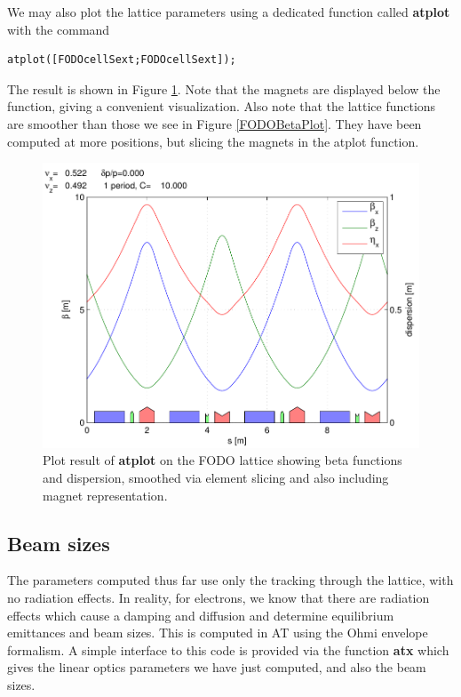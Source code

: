 \documentclass[acus]{article}
\newcommand{\mfun}[1]{{\bf{#1}}}
\begin{document}
We may also plot the lattice parameters using a dedicated function called \mfun{atplot}
with the command
\begin{verbatim}
atplot([FODOcellSext;FODOcellSext]);
\end{verbatim}
The result is shown in Figure \ref{FODOATPlot}. Note that the magnets are displayed below
the function, giving a convenient visualization.  Also note that the lattice functions are smoother
than those we see in Figure \ref{FODOBetaPlot}.
They have been computed at more positions, but slicing the magnets in the atplot function.

\begin{figure}[htb]
\centering
\includegraphics[scale=0.5]{FODOATPlot.pdf}
\caption{Plot result of \mfun{atplot} on the FODO lattice showing beta functions and dispersion,
smoothed via element slicing and also including magnet representation.}
\label{FODOATPlot}
\end{figure}

\subsection{Beam sizes}
The parameters computed thus far use only the tracking through the lattice, with no radiation
effects.  In reality, for electrons, we know that there are radiation effects which cause
a damping and diffusion and determine equilibrium emittances and beam sizes.
This is computed in AT using the Ohmi envelope formalism.  A simple interface to this code
is provided via the function \mfun{atx} which gives the linear optics parameters we have
just computed, and also the beam sizes.
\end{document}
